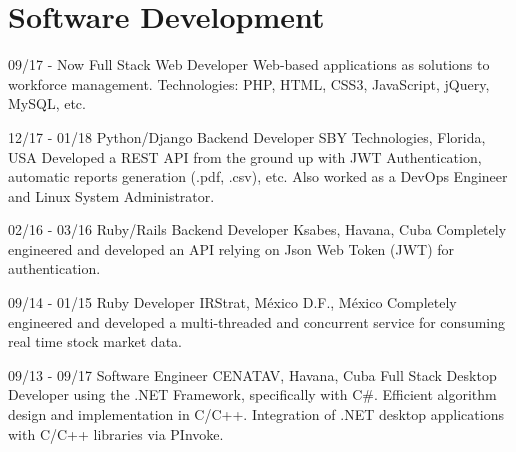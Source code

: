 \documentclass[]{friggeri-cv}
\begin{document}
\section{Software Development}
\begin{entrylist}
  \entry
    {09/17 - Now}
    {Full Stack Web Developer}
    {}
    {Web-based applications as solutions to workforce management. Technologies: PHP, HTML, CSS3, JavaScript, jQuery, MySQL, etc.\\} 

  \entry
    {12/17 - 01/18}
    {Python/Django Backend Developer}
    {SBY Technologies, Florida, USA}   
    {Developed a REST API from the ground up with JWT Authentication, automatic reports generation (.pdf, .csv), etc. Also worked as a DevOps Engineer and Linux System Administrator.\\}  
  
  \entry
    {02/16 - 03/16}
    {Ruby/Rails Backend Developer}
    {Ksabes, Havana, Cuba}
    {Completely engineered and developed an API relying on Json Web Token (JWT) for authentication.\\}
  
  \entry
    {09/14 - 01/15}
    {Ruby Developer}
    {IRStrat, México D.F., México}
    {Completely engineered and developed a multi-threaded and concurrent service for consuming real time stock market data.\\}

  \entry
    {09/13 - 09/17}
    {Software Engineer}
    {CENATAV, Havana, Cuba}
    {Full Stack Desktop Developer using the .NET Framework, specifically with C\#. Efficient algorithm design and implementation in C/C++. Integration of .NET desktop applications with C/C++ libraries via PInvoke.\\}
\end{entrylist}

\pagebreak
\end{document}

